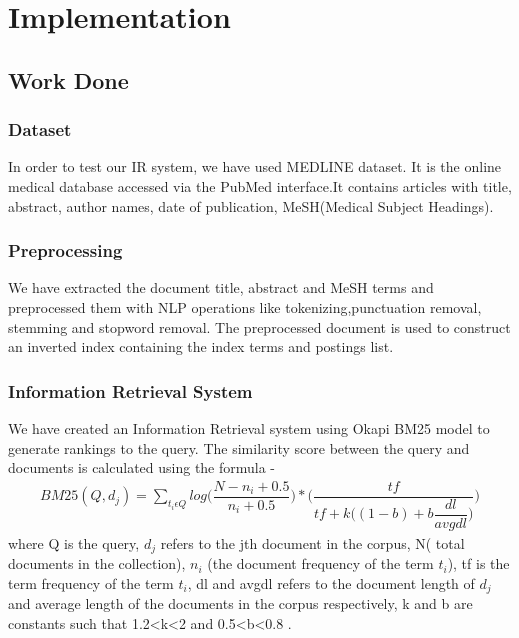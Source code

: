 \documentclass{nitk}
\begin{document}
\section{Implementation}
 \subsection{Work Done}
 \subsubsection{Dataset}
 In order to test our IR system, we have used MEDLINE dataset. It is the online medical database accessed via the PubMed interface.It contains articles with title, abstract, author names, date of publication, MeSH(Medical Subject Headings).
 \subsubsection{Preprocessing}
 We have extracted the document title, abstract and MeSH terms and preprocessed them with NLP operations like tokenizing,punctuation removal, stemming and stopword removal. The preprocessed document is used to construct an inverted index containing the index terms and postings list.
 \subsubsection{Information Retrieval System}
 We have created an Information Retrieval system using Okapi BM25 model to generate rankings to the query. The similarity score between the query and documents is calculated using the formula - 
\begin{equation}
\label{eq:okapi bm25}
\begin{aligned}
    BM25{(Q,d_j)}= \sum_{t_i \epsilon Q} {log\bigg({\dfrac{N-n_i+0.5}{n_i+0.5}}\bigg)*\bigg({\dfrac{tf}{tf+k\Big((1-b)+b{\dfrac{dl}{avgdl}}\Big)}}\bigg)}
\end{aligned}
\end{equation}
where Q is the query, ${d_j}$ refers to the jth document in the corpus, N( total documents in the collection), ${n_i}$ (the document frequency of the term $t_i$), tf is the term frequency of the term $t_i$, dl and avgdl refers to the document length of $d_j$ and average length of the documents in the corpus respectively, k and b are constants such that 1.2<k<2 and 0.5<b<0.8 .
\end{document}
